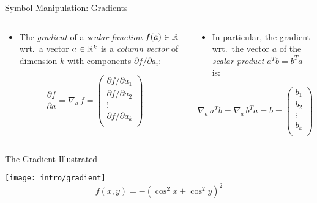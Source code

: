 \documentclass[mathserif, aspectratio=169]{beamer}
\begin{document}
\begin{frame}{Symbol Manipulation: Gradients}
	\begin{columns}[t]
		\begin{column}{0.5\textwidth}
			\begin{itemize}
				\item The \emph{gradient} of a \emph{scalar function} $f(a) \in \mathbb{R}$ wrt.\ a vector $a \in \mathbb{R}^k$ is
					a \emph{column vector} of dimension $k$ with components ${\partial f}/{\partial a_i}$: 
			\end{itemize}
			\vspace{-5mm}
			\begin{center}
				\[ 
					\frac{\partial f}{\partial a} = \nabla_a\, f =
					\begin{pmatrix}
						{\partial f}/{\partial a_1} \\ 
						{\partial f}/{\partial a_2} \\
						\vdots \\
						{\partial f}/{\partial a_k} \\ 
					\end{pmatrix}
				\]
			\end{center}
		\end{column}
		\begin{column}{0.5\textwidth}
			\begin{itemize}
				\item In particular, the gradient wrt.\ the vector $a$ of the \emph{scalar product} $a^T b = b^T a$ is:
			\end{itemize}
			\begin{center}
				\[ 
					\nabla_a\, a^T b = \nabla_a\, b^T a = b =
					\begin{pmatrix}
						b_1 \\ b_2 \\ \vdots \\ b_k \\
					\end{pmatrix}
				\]
			\end{center}
		\end{column}
	\end{columns}
\end{frame}

\begin{frame}{The Gradient Illustrated}
	\begin{center}
		\texttt{[image: intro/gradient]}
		{\antsize \[ f(x, y) = - (\cos^2 x + \cos^2 y)^2 \]}
	\end{center}
\end{frame}
\end{document}
